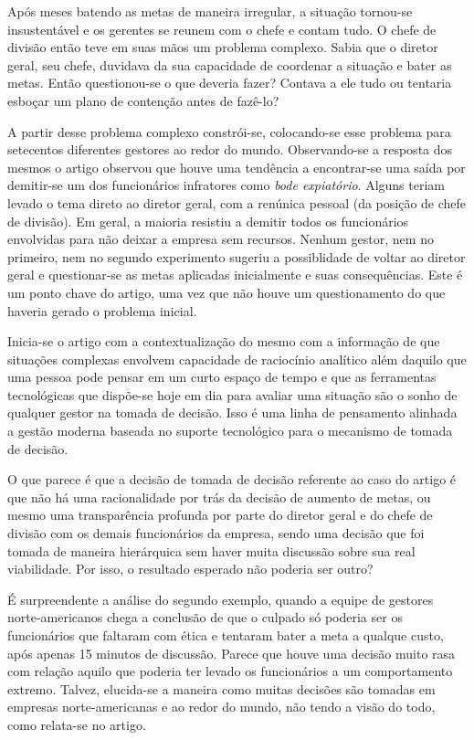 Após meses batendo as metas de maneira irregular, a situação tornou-se
insustentável e os gerentes se reunem com o chefe e contam tudo. O
chefe de divisão então teve em suas mãos um problema complexo. Sabia
que o diretor geral, seu chefe, duvidava da sua capacidade de coordenar
a situação e bater as metas. Então questionou-se o que deveria fazer?
Contava a ele tudo ou tentaria esboçar um plano de contenção antes
de fazê-lo?

A partir desse problema complexo constrói-se, colocando-se esse problema
para setecentos diferentes gestores ao redor do mundo. Observando-se
a resposta dos mesmos o artigo observou que houve uma tendência a
encontrar-se uma saída por demitir-se um dos funcionários infratores
como \emph{bode expiatório}. Alguns teriam levado o tema direto ao
diretor geral, com a renúnica pessoal (da posição de chefe de divisão).
Em geral, a maioria resistiu a demitir todos os funcionários envolvidas
para não deixar a empresa sem recursos. Nenhum gestor, nem no primeiro,
nem no segundo experimento sugeriu a possiblidade de voltar ao diretor
geral e questionar-se as metas aplicadas inicialmente e suas consequências.
Este é um ponto chave do artigo, uma vez que não houve um questionamento
do que haveria gerado o problema inicial. 

Inicia-se o artigo com a contextualização do mesmo com a informação
de que situações complexas envolvem capacidade de raciocínio analítico
além daquilo que uma pessoa pode pensar em um curto espaço de tempo
e que as ferramentas tecnológicas que dispõe-se hoje em dia para avaliar
uma situação são o sonho de qualquer gestor na tomada de decisão.
Isso é uma linha de pensamento alinhada a gestão moderna baseada no
suporte tecnológico para o mecanismo de tomada de decisão.

O que parece é que a decisão de tomada de decisão referente ao caso
do artigo é que não há uma racionalidade por trás da decisão de aumento
de metas, ou mesmo uma transparência profunda por parte do diretor
geral e do chefe de divisão com os demais funcionários da empresa,
sendo uma decisão que foi tomada de maneira hierárquica sem haver
muita discussão sobre sua real viabilidade. Por isso, o resultado
esperado não poderia ser outro? 

É surpreendente a análise do segundo exemplo, quando a equipe de gestores
norte-americanos chega a conclusão de que o culpado só poderia ser
os funcionários que faltaram com ética e tentaram bater a meta a qualque
custo, após apenas 15 minutos de discussão. Parece que houve uma decisão
muito rasa com relação aquilo que poderia ter levado os funcionários
a um comportamento extremo. Talvez, elucida-se a maneira como muitas
decisões são tomadas em empresas norte-americanas e ao redor do mundo,
não tendo a visão do todo, como relata-se no artigo.

